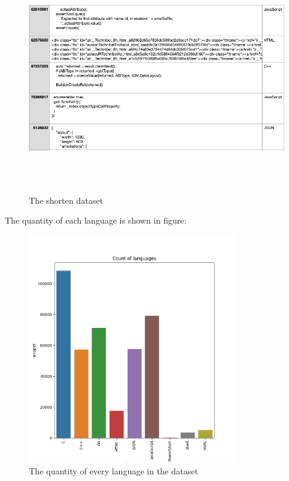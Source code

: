 \begin{figure}[!h]
	\centering
	\includegraphics[width=\linewidth, height=10cm,keepaspectratio]{figures/dataset4.png}
  \caption{The shorten dataset}
\end{figure}

\newpage
The quantity of each language is shown in figure: 
\begin{figure}[!h]
	\centering
	\includegraphics[width=\linewidth, height=10cm,keepaspectratio]{figures/dataset5.png}
  \caption{The quantity of every language in the dataset}
\end{figure}



